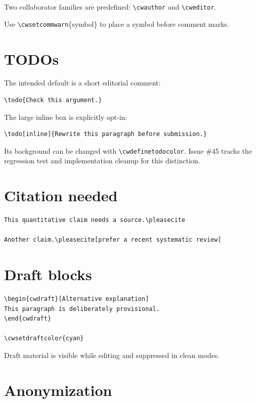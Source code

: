 \documentclass[11pt]{article}
\newcommand{\cmd}[1]{\texttt{\textbackslash#1}}
\begin{document}
Two collaborator families are predefined: \cmd{cwauthor} and \cmd{cweditor}.

Use \cmd{cwsetcommwarn}\{symbol\} to place a symbol before comment marks.

\section*{TODOs}

The intended default is a short editorial comment:

\begin{verbatim}
\todo{Check this argument.}
\end{verbatim}

The large inline box is explicitly opt-in:

\begin{verbatim}
\todo[inline]{Rewrite this paragraph before submission.}
\end{verbatim}

Its background can be changed with \cmd{cwdefinetodocolor}. Issue \#45 tracks the regression test and implementation cleanup for this distinction.

\section*{Citation needed}

\begin{verbatim}
This quantitative claim needs a source.\pleasecite

Another claim.\pleasecite[prefer a recent systematic review]
\end{verbatim}

\section*{Draft blocks}

\begin{verbatim}
\begin{cwdraft}[Alternative explanation]
This paragraph is deliberately provisional.
\end{cwdraft}

\cwsetdraftcolor{cyan}
\end{verbatim}

Draft material is visible while editing and suppressed in clean modes.

\section*{Anonymization}
\end{document}
